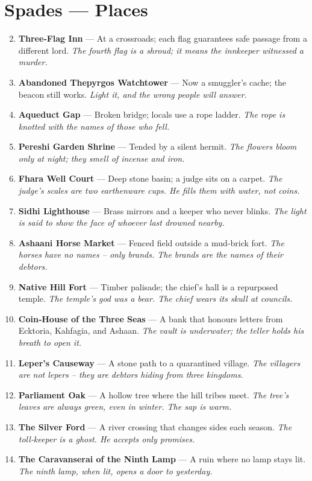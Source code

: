 \documentclass[11pt]{book}
\begin{document}
\section*{Spades — Places}
\begin{enumerate}
\setcounter{enumi}{1}
\item \textbf{Three‑Flag Inn} — At a crossroads; each flag guarantees safe passage from a different lord. \textit{The fourth flag is a shroud; it means the innkeeper witnessed a murder.}
\item \textbf{Abandoned Thepyrgos Watchtower} — Now a smuggler’s cache; the beacon still works. \textit{Light it, and the wrong people will answer.}
\item \textbf{Aqueduct Gap} — Broken bridge; locals use a rope ladder. \textit{The rope is knotted with the names of those who fell.}
\item \textbf{Pereshi Garden Shrine} — Tended by a silent hermit. \textit{The flowers bloom only at night; they smell of incense and iron.}
\item \textbf{Fhara Well Court} — Deep stone basin; a judge sits on a carpet. \textit{The judge’s scales are two earthenware cups. He fills them with water, not coins.}
\item \textbf{Sidhi Lighthouse} — Brass mirrors and a keeper who never blinks. \textit{The light is said to show the face of whoever last drowned nearby.}
\item \textbf{Ashaani Horse Market} — Fenced field outside a mud‑brick fort. \textit{The horses have no names – only brands. The brands are the names of their debtors.}
\item \textbf{Native Hill Fort} — Timber palisade; the chief’s hall is a repurposed temple. \textit{The temple’s god was a bear. The chief wears its skull at councils.}
\item \textbf{Coin‑House of the Three Seas} — A bank that honours letters from Ecktoria, Kahfagia, and Ashaan. \textit{The vault is underwater; the teller holds his breath to open it.}
\item[J] \textbf{Leper’s Causeway} — A stone path to a quarantined village. \textit{The villagers are not lepers – they are debtors hiding from three kingdoms.}
\item[Q] \textbf{Parliament Oak} — A hollow tree where the hill tribes meet. \textit{The tree’s leaves are always green, even in winter. The sap is warm.}
\item[K] \textbf{The Silver Ford} — A river crossing that changes sides each season. \textit{The toll‑keeper is a ghost. He accepts only promises.}
\item[A] \textbf{The Caravanserai of the Ninth Lamp} — A ruin where no lamp stays lit. \textit{The ninth lamp, when lit, opens a door to yesterday.}
\end{enumerate}
\end{document}

